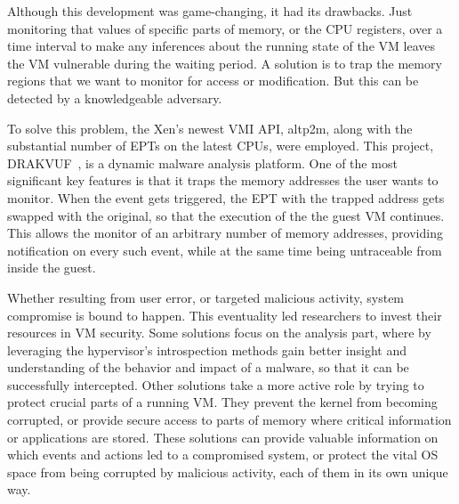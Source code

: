\par Although this development was game-changing, it had its drawbacks. Just monitoring that values of specific parts of memory, or the \ac{CPU} registers, over a time interval to make any inferences about the running state of the \ac{VM} leaves the \ac{VM} vulnerable during the waiting period. A solution is to trap the memory regions that we want to monitor for access or modification. But this can be detected by a knowledgeable adversary. 

\par To solve this problem, the Xen’s newest \ac{VMI} \ac{API}, altp2m, along with the substantial number of \ac{EPT}s on the latest \ac{CPU}s, were employed. This project, DRAKVUF~\cite{lengyel2014drakvuf}, is a dynamic malware analysis platform. One of the most significant key features is that it traps the memory addresses the user wants to monitor. When the event gets triggered, the \ac{EPT} with the trapped address gets swapped with the original, so that the execution of the the guest \ac{VM} continues. This allows the monitor of an arbitrary number of memory addresses, providing notification on every such event, while at the same time being untraceable from inside the guest.

\par Whether resulting from user error, or targeted malicious activity, system compromise is bound to happen. This eventuality led researchers to invest their resources in \ac{VM} security. Some solutions focus on the analysis part, where by leveraging the hypervisor's introspection methods gain better insight and understanding of the behavior and impact of a malware, so that it can be successfully intercepted. Other solutions take a more active role by trying to protect crucial parts of a running \ac{VM}. They prevent the kernel from becoming corrupted, or provide secure access to parts of memory where critical information or applications are stored. 
These solutions can provide valuable information on which events and actions led to a compromised system, or protect the vital \ac{OS} space from being corrupted by malicious activity, each of them in its own unique way. 


